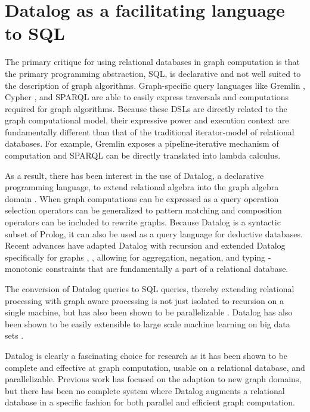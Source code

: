 \documentclass[11pt,letterpaper]{article}
\begin{document}
\section*{Datalog as a facilitating language to SQL}

The primary critique for using relational databases in graph computation is that the primary programming abstraction, SQL, is declarative and not well suited to the description of graph algorithms. Graph-specific query languages like Gremlin \cite{rodriguez_gremlin_2013}, Cypher \cite{miller_graph_2013}, and SPARQL \cite{prudhommeaux_sparql_2008} are able to easily express traversals and computations required for graph algorithms. Because these DSLs are directly related to the graph computational model, their expressive power and execution context are fundamentally different than that of the traditional iterator-model of relational databases. For example, Gremlin exposes a pipeline-iterative mechanism of computation and SPARQL can be directly translated into lambda calculus.

As a result, there has been interest in the use of Datalog, a declarative programming language, to extend relational algebra into the graph algebra domain \cite{he_graphs-at--time:_2008}. When graph computations can be expressed as a query operation selection operators can be generalized to pattern matching and composition operators can be included to rewrite graphs. Because Datalog is a syntactic subset of Prolog, it can also be used as a query language for deductive databases. Recent advances have adapted Datalog with recursion and extended Datalog specifically for graphs \cite{shkapsky_graph_2013}, \cite{green_datalog_2013}, allowing for aggregation, negation, and typing - monotonic constraints that are fundamentally a part of a relational database.

The conversion of Datalog queries to SQL queries, thereby extending relational processing with graph aware processing is not just isolated to recursion on a single machine, but has also been shown to be parallelizable \cite{seo_distributed_2013}. Datalog has also been shown to be easily extensible to large scale machine learning on big data sets \cite{bu_scaling_2012}.

Datalog is clearly a fascinating choice for research as it has been shown to be complete and effective at graph computation, usable on a relational database, and parallelizable. Previous work has focused on the adaption to new graph domains, but there has been no complete system where Datalog augments a relational database in a specific fashion for both parallel and efficient graph computation.
\end{document}
